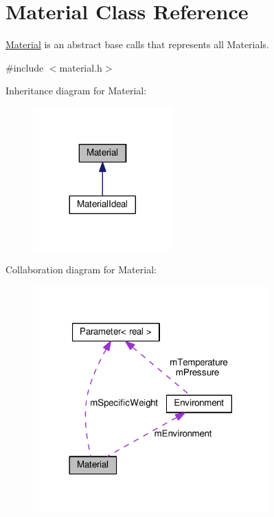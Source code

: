 \hypertarget{classMaterial}{}\section{Material Class Reference}
\label{classMaterial}


\hyperlink{classMaterial}{Material} is an abstract base calls that represents all Materials.  




{\ttfamily \#include $<$material.\+h$>$}



Inheritance diagram for Material\+:
\nopagebreak
\begin{figure}[H]
\begin{center}
\leavevmode
\includegraphics[width=152pt]{classMaterial__inherit__graph}
\end{center}
\end{figure}


Collaboration diagram for Material\+:
\nopagebreak
\begin{figure}[H]
\begin{center}
\leavevmode
\includegraphics[width=257pt]{classMaterial__coll__graph}
\end{center}
\end{figure}
